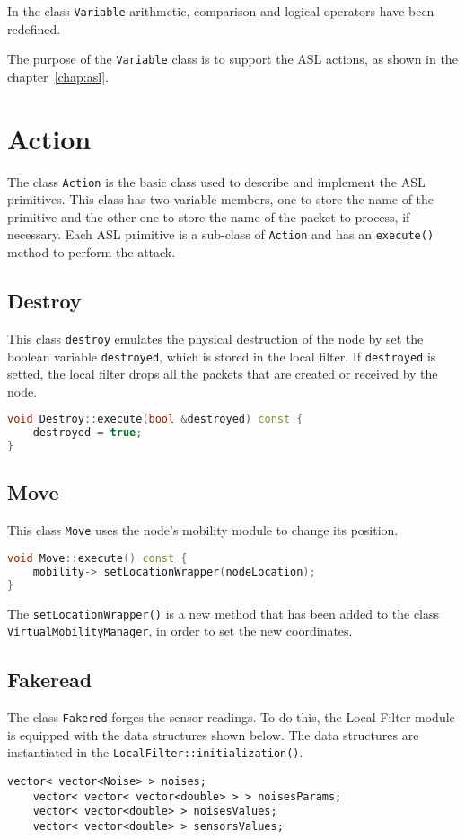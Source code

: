 In the class \texttt{Variable} arithmetic, comparison and logical operators have been redefined. 

The purpose of the \texttt{Variable} class is to support the ASL actions, as shown in the chapter~\ref{chap:asl}. 



\section{Action}
The class \texttt{Action} is the basic class used to describe and implement the ASL primitives. This class has two variable members, one to store the name of the primitive and the other one to store the name of the packet to process, if necessary. Each ASL primitive is a sub-class of \texttt{Action} and has an \texttt{execute()} method to perform the attack.


\subsection{Destroy}
This class \texttt{destroy} emulates the physical destruction of the node by set the boolean variable \texttt{destroyed}, which is stored in the local filter. If \texttt{destroyed} is setted, the local filter drops all the packets that are created or received by the node.
%
\begin{lstlisting}[language={cpp}]
void Destroy::execute(bool &destroyed) const {
	destroyed = true;
}
\end{lstlisting}


\subsection{Move}
This class \texttt{Move} uses the node's mobility module to change its position.
%
\begin{lstlisting}[language={cpp}]
void Move::execute() const {
	mobility-> setLocationWrapper(nodeLocation);
}
\end{lstlisting}

The \texttt{setLocationWrapper()} is a new method that has been added to the class \texttt{VirtualMobilityManager}, in order to set the new coordinates.








\subsection{Fakeread}
The class \texttt{Fakered} forges the sensor readings. To do this, the Local Filter module is equipped with the data structures shown below. The data structures are instantiated in the \texttt{LocalFilter::initialization()}.
%
\begin{lstlisting}[columns=flexible, firstnumber=110, label=list:lf, caption=\texttt{LocalFilter.h}]
	vector< vector<Noise> > noises;
	vector< vector< vector<double> > > noisesParams;
	vector< vector<double> > noisesValues;
	vector< vector<double> > sensorsValues;
\end{lstlisting}

